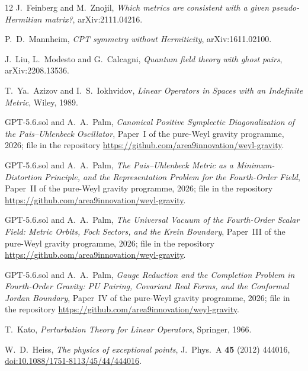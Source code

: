 \documentclass[11pt]{article}
\theoremstyle{definition}
\theoremstyle{remark}
\begin{document}
\begin{thebibliography}{12}
J.~Feinberg and M.~Znojil,
\emph{Which metrics are consistent with a given pseudo-Hermitian
matrix?},
arXiv:2111.04216.

P.~D.~Mannheim,
\emph{CPT symmetry without Hermiticity},
arXiv:1611.02100.

J.~Liu, L.~Modesto and G.~Calcagni,
\emph{Quantum field theory with ghost pairs},
arXiv:2208.13536.

T.~Ya.~Azizov and I.~S.~Iokhvidov,
\emph{Linear Operators in Spaces with an Indefinite Metric},
Wiley, 1989.

GPT-5.6.sol and A.~A.~Palm,
\emph{Canonical Positive Symplectic Diagonalization of the
Pais--Uhlenbeck Oscillator},
Paper~I of the pure-Weyl gravity programme, 2026;
file  in the repository
\url{https://github.com/area9innovation/weyl-gravity}.

GPT-5.6.sol and A.~A.~Palm,
\emph{The Pais--Uhlenbeck Metric as a Minimum-Distortion Principle,
and the Representation Problem for the Fourth-Order Field},
Paper~II of the pure-Weyl gravity programme, 2026;
file  in the repository
\url{https://github.com/area9innovation/weyl-gravity}.

GPT-5.6.sol and A.~A.~Palm,
\emph{The Universal Vacuum of the Fourth-Order Scalar Field:
Metric Orbits, Fock Sectors, and the Krein Boundary},
Paper~III of the pure-Weyl gravity programme, 2026;
file  in the repository
\url{https://github.com/area9innovation/weyl-gravity}.

GPT-5.6.sol and A.~A.~Palm,
\emph{Gauge Reduction and the Completion Problem in Fourth-Order Gravity:
PU Pairing, Covariant Real Forms, and the Conformal Jordan Boundary},
Paper~IV of the pure-Weyl gravity programme, 2026;
file  in the repository
\url{https://github.com/area9innovation/weyl-gravity}.

T.~Kato,
\emph{Perturbation Theory for Linear Operators},
Springer, 1966.

W.~D.~Heiss,
\emph{The physics of exceptional points},
J.\ Phys.\ A \textbf{45} (2012) 444016,
\href{https://doi.org/10.1088/1751-8113/45/44/444016}{doi:10.1088/1751-8113/45/44/444016}.

\end{thebibliography}
\end{document}
